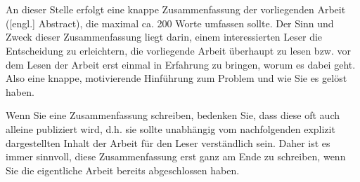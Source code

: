 \thispagestyle{empty}\section*{}
An dieser Stelle erfolgt eine knappe Zusammenfassung der vorliegenden Arbeit ([engl.] Abstract), die maximal ca. 200 Worte umfassen sollte. Der Sinn und Zweck dieser Zusammenfassung liegt darin, einem interessierten Leser die Entscheidung zu erleichtern, die vorliegende Arbeit überhaupt zu lesen bzw. vor dem Lesen der Arbeit erst einmal in Erfahrung zu bringen, worum es dabei geht. Also eine knappe, motivierende Hinführung zum Problem und wie Sie es gelöst haben.

Wenn Sie eine Zusammenfassung schreiben, bedenken Sie, dass diese oft auch alleine publiziert wird, d.h. sie sollte unabhängig vom nachfolgenden explizit dargestellten Inhalt der Arbeit für den Leser verständlich sein. Daher ist es immer sinnvoll, diese Zusammenfassung erst ganz am Ende zu schreiben, wenn Sie die eigentliche Arbeit bereits abgeschlossen haben.